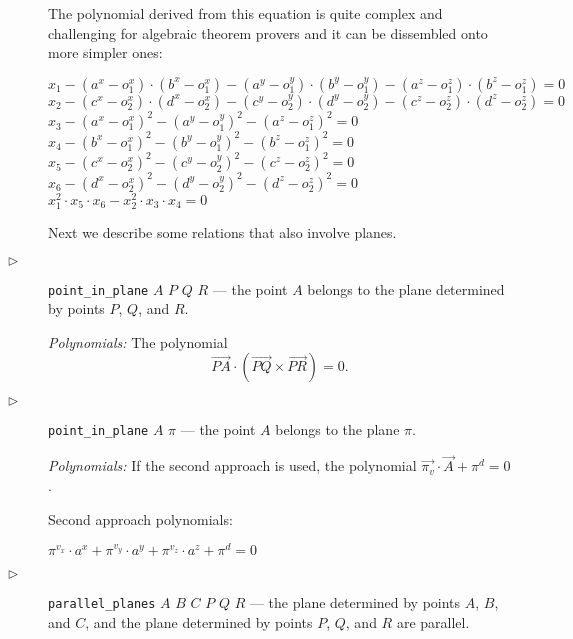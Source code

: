 \documentclass{article}
\begin{document}
\begin{description}
The polynomial derived from this equation is quite complex and
challenging for algebraic theorem provers and it can be dissembled
onto more simpler ones:
\begin{tabbing}
$x_1 - (a^x - o_1^x)\cdot(b^x - o_1^x) - (a^y - o_1^y)\cdot(b^y - o_1^y) - (a^z - o_1^z)\cdot(b^z - o_1^z) = 0$ \\
$x_2 - (c^x - o_2^x)\cdot(d^x - o_2^x) - (c^y - o_2^y)\cdot(d^y - o_2^y) - (c^z - o_2^z)\cdot(d^z - o_2^z) = 0$ \\
$x_3 - (a^x - o_1^x)^2 - (a^y - o_1^y)^2 - (a^z - o_1^z)^2 = 0$ \\
$x_4 - (b^x - o_1^x)^2 - (b^y - o_1^y)^2 - (b^z - o_1^z)^2 = 0$ \\
$x_5 - (c^x - o_2^x)^2 - (c^y - o_2^y)^2 - (c^z - o_2^z)^2 = 0$ \\
$x_6 - (d^x - o_2^x)^2 - (d^y - o_2^y)^2 - (d^z - o_2^z)^2 = 0$ \\
$x_1^2\cdot x_5 \cdot x_6 - x_2^2\cdot x_3\cdot x_4 = 0$
\end{tabbing}

\bigskip

Next we describe some relations that also involve planes.


\item[$\triangleright$] {\tt point\_in\_plane} $A$ $P$ $Q$ $R$
  --- the point $A$ belongs to the plane determined by points $P$,
  $Q$, and $R$.

  {\em Polynomials:} The polynomial
$$\overrightarrow{PA}\cdot (\overrightarrow{PQ} \times \overrightarrow{PR}) = 0.$$

\item[$\triangleright$] {\tt point\_in\_plane} $A$ $\pi$ --- the
  point $A$ belongs to the plane $\pi$.

  {\em Polynomials:} If the second approach is used, the polynomial
  $\overrightarrow{\pi_v} \cdot \overrightarrow{A} + \pi^{d} = 0$.

Second approach polynomials:
\begin{tabbing}
$\pi^{v_x}\cdot a^x + \pi^{v_y}\cdot a^y + \pi^{v_z}\cdot a^z + \pi^{d} = 0$
\end{tabbing}


\item[$\triangleright$] {\tt parallel\_planes} $A$ $B$ $C$ $P$ $Q$ $R$
  --- the plane determined by points $A$, $B$, and $C$, and the plane
  determined by points $P$, $Q$, and $R$ are parallel.


\end{description}
\end{document}
